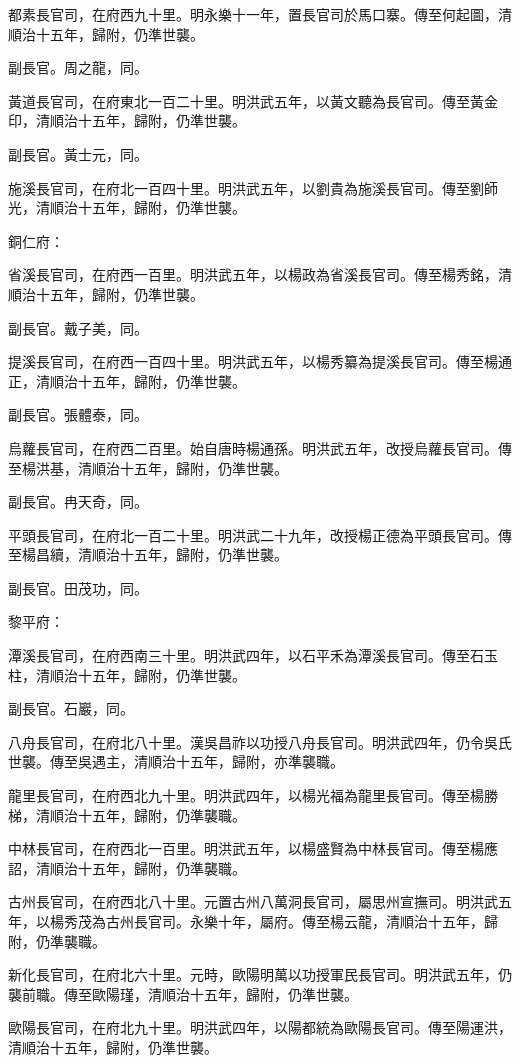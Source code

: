 \begin{pinyinscope}
都素長官司，在府西九十里。明永樂十一年，置長官司於馬口寨。傳至何起圖，清順治十五年，歸附，仍準世襲。

副長官。周之龍，同。

黃道長官司，在府東北一百二十里。明洪武五年，以黃文聽為長官司。傳至黃金印，清順治十五年，歸附，仍準世襲。

副長官。黃士元，同。

施溪長官司，在府北一百四十里。明洪武五年，以劉貴為施溪長官司。傳至劉師光，清順治十五年，歸附，仍準世襲。

銅仁府：

省溪長官司，在府西一百里。明洪武五年，以楊政為省溪長官司。傳至楊秀銘，清順治十五年，歸附，仍準世襲。

副長官。戴子美，同。

提溪長官司，在府西一百四十里。明洪武五年，以楊秀纂為提溪長官司。傳至楊通正，清順治十五年，歸附，仍準世襲。

副長官。張體泰，同。

烏蘿長官司，在府西二百里。始自唐時楊通孫。明洪武五年，改授烏蘿長官司。傳至楊洪基，清順治十五年，歸附，仍準世襲。

副長官。冉天奇，同。

平頭長官司，在府北一百二十里。明洪武二十九年，改授楊正德為平頭長官司。傳至楊昌續，清順治十五年，歸附，仍準世襲。

副長官。田茂功，同。

黎平府：

潭溪長官司，在府西南三十里。明洪武四年，以石平禾為潭溪長官司。傳至石玉柱，清順治十五年，歸附，仍準世襲。

副長官。石巖，同。

八舟長官司，在府北八十里。漢吳昌祚以功授八舟長官司。明洪武四年，仍令吳氏世襲。傳至吳遇主，清順治十五年，歸附，亦準襲職。

龍里長官司，在府西北九十里。明洪武四年，以楊光福為龍里長官司。傳至楊勝梯，清順治十五年，歸附，仍準襲職。

中林長官司，在府西北一百里。明洪武五年，以楊盛賢為中林長官司。傳至楊應詔，清順治十五年，歸附，仍準襲職。

古州長官司，在府西北八十里。元置古州八萬洞長官司，屬思州宣撫司。明洪武五年，以楊秀茂為古州長官司。永樂十年，屬府。傳至楊云龍，清順治十五年，歸附，仍準襲職。

新化長官司，在府北六十里。元時，歐陽明萬以功授軍民長官司。明洪武五年，仍襲前職。傳至歐陽瑾，清順治十五年，歸附，仍準世襲。

歐陽長官司，在府北九十里。明洪武四年，以陽都統為歐陽長官司。傳至陽運洪，清順治十五年，歸附，仍準世襲。


\end{pinyinscope}
